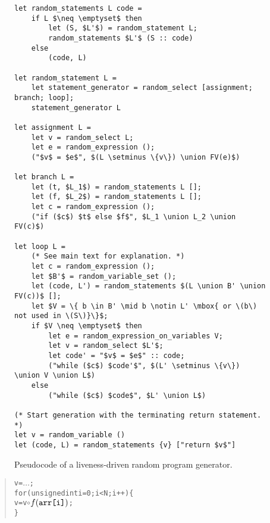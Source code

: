\documentclass[a4paper]{easychair}
\def\union{\cup}
\begin{document}
\begin{figure}
\begin{lstlisting}
let random_statements L code =
    if L $\neq \emptyset$ then
        let (S, $L'$) = random_statement L;
        random_statements $L'$ (S :: code)
    else
        (code, L)

let random_statement L =
    let statement_generator = random_select [assignment; branch; loop];
    statement_generator L

let assignment L =
    let v = random_select L;
    let e = random_expression ();
    ("$v$ = $e$", $(L \setminus \{v\}) \union FV(e)$)

let branch L =
    let (t, $L_1$) = random_statements L [];
    let (f, $L_2$) = random_statements L [];
    let c = random_expression ();
    ("if ($c$) $t$ else $f$", $L_1 \union L_2 \union FV(c)$)

let loop L =
    (* See main text for explanation. *)
    let c = random_expression ();
    let $B'$ = random_variable_set ();
    let (code, L') = random_statements $(L \union B' \union FV(c))$ [];
    let $V = \{ b \in B' \mid b \notin L' \mbox{ or \(b\) not used in \(S\)}\}$;
    if $V \neq \emptyset$ then
        let e = random_expression_on_variables V;
        let v = random_select $L'$;
        let code' = "$v$ = $e$" :: code;
        ("while ($c$) $code'$", $(L' \setminus \{v\}) \union V \union L$)
    else
        ("while ($c$) $code$", $L' \union L$)

(* Start generation with the terminating return statement. *)
let v = random_variable ()
let (code, L) = random_statements {v} ["return $v$"]
\end{lstlisting}
\caption{Pseudocode of a liveness-driven random program generator.}
\label{fig:generator}
\end{figure}

\begin{quote}
\begin{alltt}
v = \(\dots\);
for (unsigned int i = 0; i < N; i++) \{
    v = v \(\circ\) \(f(\mbox{\texttt{arr[i]}})\);
\}
\end{alltt}
\end{quote}
\end{document}
